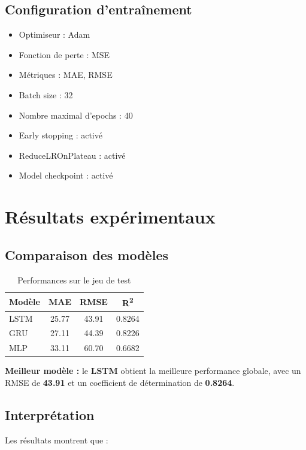 \documentclass[11pt,a4paper]{article}
\begin{document}
\subsection{Configuration d'entraînement}
\begin{itemize}
    \item Optimiseur : Adam
    \item Fonction de perte : MSE
    \item Métriques : MAE, RMSE
    \item Batch size : 32
    \item Nombre maximal d'epochs : 40
    \item Early stopping : activé
    \item ReduceLROnPlateau : activé
    \item Model checkpoint : activé
\end{itemize}

\section{Résultats expérimentaux}

\subsection{Comparaison des modèles}

\begin{table}[H]
\centering
\caption{Performances sur le jeu de test}
\begin{tabular}{lccc}
\toprule
\textbf{Modèle} & \textbf{MAE} & \textbf{RMSE} & \textbf{R\textsuperscript{2}} \\
\midrule
LSTM & 25.77 & 43.91 & 0.8264 \\
GRU  & 27.11 & 44.39 & 0.8226 \\
MLP  & 33.11 & 60.70 & 0.6682 \\
\bottomrule
\end{tabular}
\end{table}

\begin{resultbox}
\textbf{Meilleur modèle :} le \textbf{LSTM} obtient la meilleure performance globale,
avec un RMSE de \textbf{43.91} et un coefficient de détermination de \textbf{0.8264}.
\end{resultbox}

\subsection{Interprétation}
Les résultats montrent que :
\end{document}
